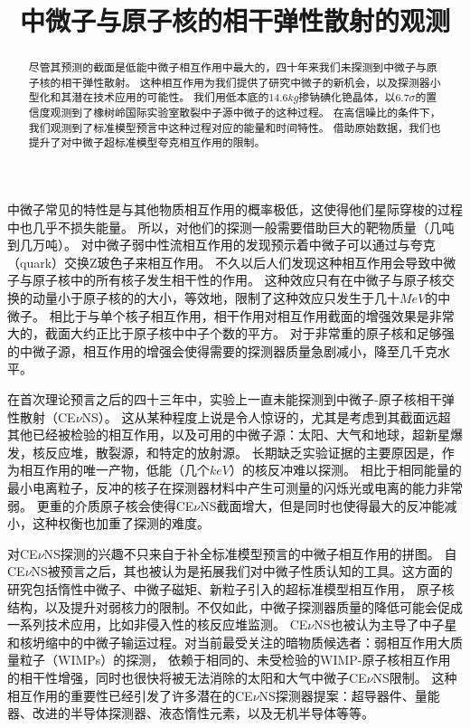 
\begin{translation}
\label{cha:translation}

\title{中微子与原子核的相干弹性散射的观测}
\maketitle

\tableofcontents

\begin{abstract}
  尽管其预测的截面是低能中微子相互作用中最大的，四十年来我们未探测到中微子与原子核的相干弹性散射。
  这种相互作用为我们提供了研究中微子的新机会，以及探测器小型化和其潜在技术应用的可能性。
  我们用低本底的14.6$\si{kg}$掺钠碘化铯晶体，以6.7$\sigma$的置信度观测到了橡树岭国际实验室散裂中子源中微子的这种过程。
  在高信噪比的条件下，我们观测到了标准模型预言中这种过程对应的能量和时间特性。
  借助原始数据，我们也提升了对中微子超标准模型夸克相互作用的限制。
\end{abstract}

中微子常见的特性是与其他物质相互作用的概率极低，这使得他们星际穿梭的过程中也几乎不损失能量。
所以，对他们的探测一般需要借助巨大的靶物质量（几吨到几万吨）。
对中微子弱中性流相互作用的发现预示着中微子可以通过与夸克（quark）交换Z玻色子来相互作用。
不久以后人们发现这种相互作用会导致中微子与原子核中的所有核子发生相干性的作用。
这种效应只有在中微子与原子核交换的动量小于原子核的的大小，等效地，限制了这种效应只发生于几十$\si{MeV}$的中微子。
相比于与单个核子相互作用，相干作用对相互作用截面的增强效果是非常大的，截面大约正比于原子核中中子个数的平方。
对于非常重的原子核和足够强的中微子源，相互作用的增强会使得需要的探测器质量急剧减小，降至几千克水平。

在首次理论预言之后的四十三年中，实验上一直未能探测到中微子-原子核相干弹性散射（CE$\nu$NS）。
这从某种程度上说是令人惊讶的，尤其是考虑到其截面远超其他已经被检验的相互作用，以及可用的中微子源：太阳、大气和地球，超新星爆发，核反应堆，散裂源，和特定的放射源。
长期缺乏实验证据的主要原因是，作为相互作用的唯一产物，低能（几个$\si{keV}$）的核反冲难以探测。
相比于相同能量的最小电离粒子，反冲的核子在探测器材料中产生可测量的闪烁光或电离的能力非常弱。
更重的介质原子核会使得CE$\nu$NS截面增大，但是同时也使得最大的反冲能减小，这种权衡也加重了探测的难度。

对CE$\nu$NS探测的兴趣不只来自于补全标准模型预言的中微子相互作用的拼图。
自CE$\nu$NS被预言之后，其也被认为是拓展我们对中微子性质认知的工具。这方面的研究包括惰性中微子、中微子磁矩、新粒子引入的超标准模型相互作用，
原子核结构，以及提升对弱核力的限制。不仅如此，中微子探测器质量的降低可能会促成一系列技术应用，比如非侵入性的核反应堆监测。
CE$\nu$NS也被认为主导了中子星和核坍缩中的中微子输运过程。对当前最受关注的暗物质候选者：弱相互作用大质量粒子（WIMPs）的探测，
依赖于相同的、未受检验的WIMP-原子核相互作用的相干性增强，同时也很快将被无法消除的太阳和大气中微子CE$\nu$NS限制。
这种相互作用的重要性已经引发了许多潜在的CE$\nu$NS探测器提案：超导器件、量能器、改进的半导体探测器、液态惰性元素，以及无机半导体等等。


\end{translation}
